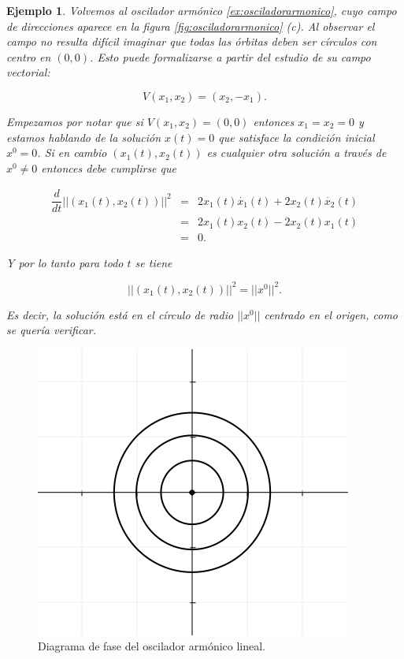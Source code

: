 \documentclass[11pt]{book}
\theoremstyle{definition}
\numberwithin{definition}{section}
\theoremstyle{theorem}
\numberwithin{theorem}{section}
\numberwithin{lemma}{section}
\numberwithin{corollary}{section}
\theoremstyle{plain}
\newtheorem{example}{Ejemplo}
\numberwithin{example}{section}
\begin{document}
\begin{example} \label{ej:sistemahiperbolas}
Volvemos al oscilador armónico \ref{ex:osciladorarmonico}, cuyo campo de direcciones aparece en la figura \ref{fig:osciladorarmonico} (c).
Al observar el campo no resulta difícil imaginar que todas las órbitas deben ser círculos con centro en $(0,0)$. Esto puede formalizarse a partir del estudio de su campo vectorial:

$$ V(x_1,x_2) = (x_2, -x_1). $$

Empezamos por notar que si $V(x_1,x_2) = (0,0)$ entonces $x_1 = x_2 = 0$ y estamos hablando de la solución $x(t) = 0$ que satisface la condición inicial $x^0 = 0$. Si en cambio $(x_1(t),x_2(t))$ es cualquier otra solución a través de $x^0 \neq 0$ entonces debe cumplirse que 

$$
\begin{array}{ccl}
	\dfrac{d}{dt} || (x_1(t),x_2(t))  ||^2 & = & 2x_1(t)\dot{x_1}(t) + 2x_2(t)\dot{x_2}(t) \\
									   & = & 2x_1(t)x_2(t) - 2x_2(t)x_1(t) \\
									   & = & 0.
\end{array}
$$

Y por lo tanto para todo $t$ se tiene

$$ ||(x_1(t), x_2(t))||^2 = ||x^0||^2. $$

Es decir, la solución está en el círculo de radio $||x^0||$ centrado en el origen, como se quería verificar.
\end{example}

\begin{figure}[h] \centering
    \includegraphics[scale=0.5]{figures/osciladorarmonico-diagramafase.png}
    \caption{Diagrama de fase del oscilador armónico lineal.}
\end{figure}
\end{document}
